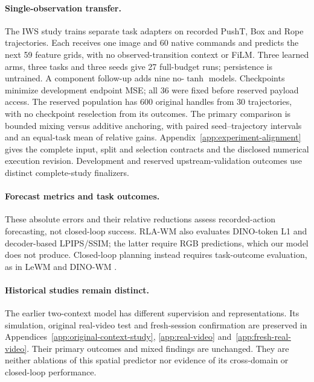 \paragraph{Single-observation transfer.}
The IWS study trains separate task adapters on recorded PushT, Box and Rope
trajectories. Each receives one image and 60 native commands and predicts
the next 59 feature grids, with no observed-transition context or FiLM.
Three learned arms, three tasks and three seeds give 27 full-budget runs;
persistence is untrained. A component follow-up adds nine no-$\tanh$ models.
Checkpoints minimize development endpoint MSE; all 36 were fixed before reserved
payload access. The reserved population has 600 original handles from 30
trajectories, with no checkpoint reselection from its outcomes.
The primary comparison is bounded mixing versus additive anchoring, with
paired seed--trajectory intervals and an equal-task mean of relative gains.
Appendix~\ref{app:experiment-alignment} gives the complete input, split and
selection contracts and the disclosed numerical execution revision. Development
and reserved upstream-validation outcomes use distinct complete-study finalizers.

\paragraph{Forecast metrics and task outcomes.}

These absolute errors and their relative
reductions assess recorded-action forecasting, not closed-loop success.
RLA-WM \citep{zhang2026rlawm} also evaluates DINO-token L1 and decoder-based
LPIPS/SSIM; the latter require RGB predictions, which our model does not produce.
Closed-loop planning instead requires task-outcome evaluation, as in LeWM and
DINO-WM \citep{maes2026lewm,zhou2024dinowm}.

\paragraph{Historical studies remain distinct.}
The earlier two-context model has different supervision and representations.
Its simulation, original real-video test and fresh-session confirmation are
preserved in Appendices~\ref{app:original-context-study},
\ref{app:real-video} and~\ref{app:fresh-real-video}. Their primary outcomes and
mixed findings are unchanged. They are neither ablations of this spatial
predictor nor evidence of its cross-domain or closed-loop performance.
